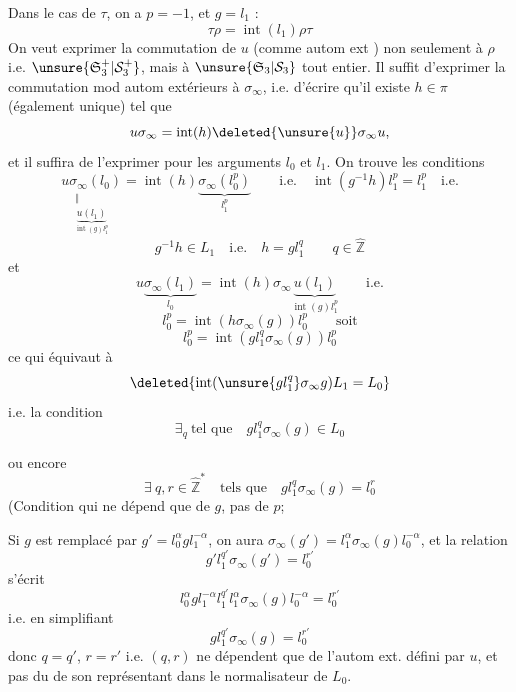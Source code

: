Dans le cas de $\tau$, on a $p=-1$, et $g=l_1$ :
\[
\tau\rho=\operatorname{int}(l_1)\rho\tau
\]
On veut exprimer la commutation de $u$ (comme autom ext ) non seulement à $\rho$ i.e. $\unsure{\mathfrak S_3^+|\mathcal S_3^+}$,
mais à $\unsure{\mathfrak S_3|\mathcal S_3}$ tout entier. Il suffit d'exprimer la commutation mod autom extérieurs à $\sigma_\infty$, i.e. d'écrire qu'il existe $h\in\pi$ (également unique) tel que
\[
u\sigma_\infty=\operatorname{int}(h)\deleted{\unsure{u}}\sigma_\infty u,
\]
et il suffira de l'exprimer pour les arguments $l_0$ et $l_1$. On trouve les conditions
\[
\underset{\substack{\Vert\\\underbrace{u(l_1)}_{\operatorname{int}(g)l_1^p}}}{u\sigma_\infty(l_0)}=\operatorname{int}(h)\underbrace{\sigma_\infty(l_0^p)}_{l_1^p}
\qquad\text{i.e.}\quad\operatorname{int}(g^{-1}h)l_1^p=l_1^p\quad\text{i.e.}
\]
\[
g^{-1}h\in L_1\quad\text{i.e.}\quad h=gl_1^{q}\qquad q\in\hat{\mathbb Z}
\]
et
\[
u\underbrace{\sigma_\infty(l_1)}_{l_0}=\operatorname{int}(h)\sigma_\infty\underbrace{u(l_1)}_{\operatorname{int}(g)l_1^p}\qquad\text{i.e.}
\]
\[
l_0^p=\operatorname{int}(h\sigma_\infty(g))l_0^p\qquad\text{soit}
\]
\[
l_0^p=\operatorname{int}(gl_1^q\sigma_\infty(g))l_0^p
\]
ce qui équivaut à
\[
\deleted{\operatorname{int}(\unsure{gl_1^q}\sigma_\infty g)L_1=L_0}
\]
i.e. la condition
\[
\exists_q\ \text{tel que}\quad gl_1^q\sigma_\infty(g)\in L_0
\]

ou encore
\[
\exists\ q,r\in\hat{\mathbb Z}^{*}\quad\text{tels que}\quad\boxed{gl_1^q\sigma_\infty(g)=l_0^r}
\]
(Condition qui ne dépend que de $g$, pas de $p$;

Si $g$ est remplacé par $g'=l_0^\alpha gl_1^{-\alpha}$, on aura $\sigma_\infty(g')=l_1^\alpha\sigma_\infty(g)l_0^{-\alpha}$, et la relation
\[
g'l_1^{q'}\sigma_\infty(g')=l_0^{r'}
\]
s'écrit
\[
l_0^\alpha gl_1^{-\alpha}l_1^{q'}l_1^\alpha\sigma_\infty(g)l_0^{-\alpha}=l_0^{r'}
\]
i.e. en simplifiant
\[
gl_1^{q'}\sigma_\infty(g)=l_0^{r'}
\]
donc $q=q'$, $r=r'$ i.e. $(q,r)$ ne dépendent que de l'autom ext. défini par $u$, et pas du  de son représentant dans le normalisateur de $L_0$.

